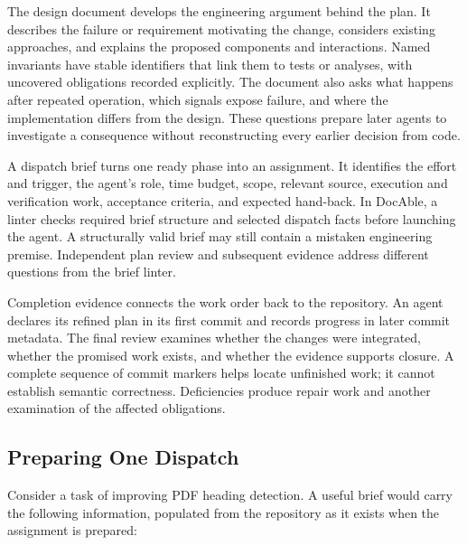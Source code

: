 The design document develops the engineering argument behind the plan. It describes the failure or requirement motivating the change, considers existing approaches, and explains the proposed components and interactions. Named invariants have stable identifiers that link them to tests or analyses, with uncovered obligations recorded explicitly. The document also asks what happens after repeated operation, which signals expose failure, and where the implementation differs from the design. These questions prepare later agents to investigate a consequence without reconstructing every earlier decision from code.

A dispatch brief turns one ready phase into an assignment. It identifies the effort and trigger, the agent's role, time budget, scope, relevant source, execution and verification work, acceptance criteria, and expected hand-back. In DocAble, a linter checks required brief structure and selected dispatch facts before launching the agent. A structurally valid brief may still contain a mistaken engineering premise. Independent plan review and subsequent evidence address different questions from the brief linter.

Completion evidence connects the work order back to the repository. An agent declares its refined plan in its first commit and records progress in later commit metadata. The final review examines whether the changes were integrated, whether the promised work exists, and whether the evidence supports closure. A complete sequence of commit markers helps locate unfinished work; it cannot establish semantic correctness. Deficiencies produce repair work and another examination of the affected obligations.

\subsection{Preparing One Dispatch}\label{heading:preparing-one-dispatch}

Consider a task of improving PDF heading detection. A useful brief would carry the following information, populated from the repository as it exists when the assignment is prepared:

